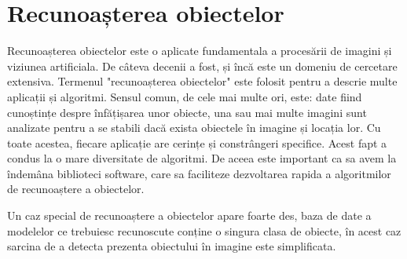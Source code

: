 \chapter{Recunoașterea obiectelor}


Recunoașterea obiectelor este o aplicate fundamentala a procesării de imagini și viziunea artificiala.
De câteva decenii a fost, și încă este un domeniu de cercetare extensiva.
Termenul "recunoașterea obiectelor" este folosit pentru a descrie multe aplicații și algoritmi.
Sensul comun, de cele mai multe ori, este: date fiind cunoștințe despre înfățișarea unor obiecte, una sau mai multe imagini sunt analizate pentru a se stabili dacă exista obiectele în imagine și locația lor.
Cu toate acestea, fiecare aplicație are cerințe și constrângeri specifice.
Acest fapt a condus la o mare diversitate de algoritmi.
De aceea este important ca sa avem la îndemâna biblioteci software, care sa faciliteze dezvoltarea rapida a algoritmilor de recunoaștere a obiectelor.

Un caz special de recunoaștere a obiectelor apare foarte des, baza de date a modelelor ce trebuiesc recunoscute conține o singura clasa de obiecte, în acest caz sarcina de a detecta prezenta obiectului în imagine este simplificata.